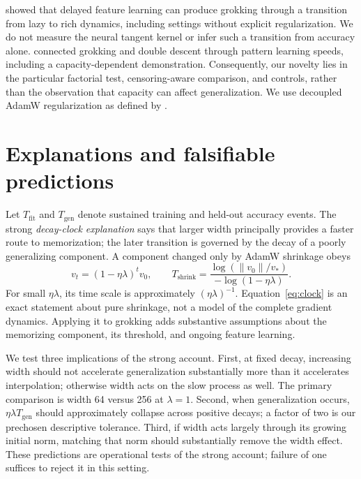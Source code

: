 \documentclass{article}
\begin{document}
\citet{kumar2024} showed that delayed feature learning can produce grokking through a transition from lazy to rich dynamics, including settings without explicit regularization. We do not measure the neural tangent kernel or infer such a transition from accuracy alone. \citet{davies2023} connected grokking and double descent through pattern learning speeds, including a capacity-dependent demonstration. Consequently, our novelty lies in the particular factorial test, censoring-aware comparison, and controls, rather than the observation that capacity can affect generalization. We use decoupled AdamW regularization as defined by \citet{adamw}.

\section{Explanations and falsifiable predictions}
\label{sec:hypotheses}
Let $T_{\mathrm{fit}}$ and $T_{\mathrm{gen}}$ denote sustained training and held-out accuracy events. The strong \emph{decay-clock explanation} says that larger width principally provides a faster route to memorization; the later transition is governed by the decay of a poorly generalizing component. A component changed only by AdamW shrinkage obeys
\begin{equation}
 v_t=(1-\eta\lambda)^t v_0,\qquad
 T_{\mathrm{shrink}}=\frac{\log(\|v_0\|/v_*)}{-\log(1-\eta\lambda)}.
 \label{eq:clock}
\end{equation}
For small $\eta\lambda$, its time scale is approximately $(\eta\lambda)^{-1}$. Equation~\ref{eq:clock} is an exact statement about pure shrinkage, not a model of the complete gradient dynamics. Applying it to grokking adds substantive assumptions about the memorizing component, its threshold, and ongoing feature learning.

We test three implications of the strong account. First, at fixed decay, increasing width should not accelerate generalization substantially more than it accelerates interpolation; otherwise width acts on the slow process as well. The primary comparison is width 64 versus 256 at $\lambda=1$. Second, when generalization occurs, $\eta\lambda T_{\mathrm{gen}}$ should approximately collapse across positive decays; a factor of two is our prechosen descriptive tolerance. Third, if width acts largely through its growing initial norm, matching that norm should substantially remove the width effect. These predictions are operational tests of the strong account; failure of one suffices to reject it in this setting.
\end{document}
